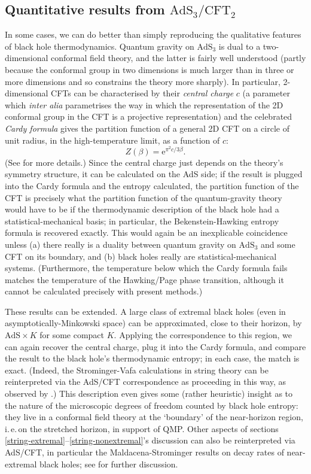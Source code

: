 \documentclass[12pt]{article}
\newcommand{\iec}{\mbox{i.\,e.\,}}
\newcommand{\be}{\begin{equation}}
\newcommand{\ee}{\end{equation}}
\newcommand{\e}[1]{\mathrm{e}^{#1}}
\newcommand{\AdS}{\mathrm{AdS}}
\newcommand{\CFT}{\mathrm{CFT}}
\begin{document}
\subsection{Quantitative results from $\AdS_3/\CFT_2$}

In some cases, we can do better than simply reproducing the qualitative features of black hole thermodynamics. Quantum gravity on $\AdS_3$ is dual to a two-dimensional conformal field theory, and the latter is fairly well understood (partly because the conformal group in two dimensions is much larger than in three or more dimensions and so constrains the theory more sharply). In particular, 2-dimensional CFTs can be characterised by their \emph{central charge} $c$ (a parameter which \emph{inter alia} parametrises the way in which the representation of the 2D conformal group in the CFT is a projective representation) and the celebrated \emph{Cardy formula} \cite{cardyformula} gives the partition function of a general 2D CFT on a circle of unit radius, in the high-temperature limit, as a function of $c$:
\be
Z(\beta)=\e{\pi^2 c/3\beta}.
\ee
(See  for more details.)
Since the central charge just depends on the theory's symmetry structure, it can be calculated on the AdS side; if the result is plugged into the Cardy formula and the entropy calculated, the partition function of the CFT is precisely what the partition function of the quantum-gravity theory would have to be if the thermodynamic description of the black hole had a statistical-mechanical basis; in particular, the Bekenstein-Hawking entropy formula is recovered exactly. This would again be an inexplicable coincidence unless (a) there really is a duality between quantum gravity on $\AdS_3$ and some CFT on its boundary, and (b) black holes really are statistical-mechanical systems. (Furthermore, the temperature below which the Cardy formula fails matches the temperature of the Hawking/Page phase transition, although it cannot be calculated precisely with present methods.)

These results can be extended. A large class of extremal black holes (even in asymptotically-Minkowski space) can be approximated, close to their horizon, by $\AdS\times K$ for some compact $K$. Applying the correspondence to this region, we can again recover the central charge, plug it into the Cardy formula, and compare the result to the black hole's thermodynamic entropy; in each case, the match is exact. (Indeed, the Strominger-Vafa calculations in string theory can be reinterpreted via the AdS/CFT correspondence as proceeding in this way, as observed by .) This description even gives some (rather heuristic) insight as to the nature of the microscopic degrees of freedom counted by black hole entropy: they live in a conformal field theory at the `boundary' of the near-horizon region, \iec on the stretched horizon, in support of QMP. Other aspects of sections \ref{string-extremal}--\ref{string-nonextremal}'s discussion can also be reinterpreted via AdS/CFT, in particular the Maldacena-Strominger results on decay rates of near-extremal black holes; see  for further discussion.
\end{document}
